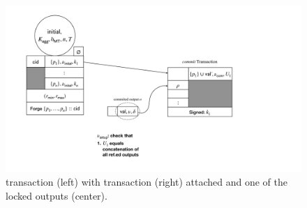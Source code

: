 \begin{figure}[t!]

  \centering

  \includegraphics[width=\textwidth/2-2em,trim=130 330 430 50,
  clip]{figures/SM_commit_tx.pdf}
    
  \caption{\mtxInit{} transaction (left) with \mtxCom{} transaction
    (right) attached and one of the locked outputs (center).}
  \label{fig:SM_commit_tx}

\end{figure}



